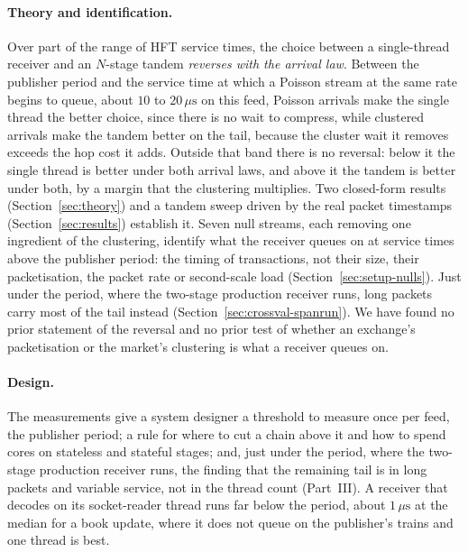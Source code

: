 \documentclass[11pt]{article}
\begin{document}
\paragraph{Theory and identification.} Over part of the range of HFT service times, the
choice between a single-thread receiver and an $N$-stage tandem \emph{reverses with the
arrival law}. Between the publisher period and the service time at which a Poisson stream
at the same rate begins to queue, about $10$ to $20\,\mu\mathrm{s}$ on this feed, Poisson
arrivals make the single thread the better choice, since there is no wait to compress,
while clustered arrivals make the tandem better on the tail, because the cluster wait it
removes exceeds the hop cost it adds. Outside that band there is no reversal: below it the
single thread is better under both arrival laws, and above it the tandem is better under
both, by a margin that the clustering multiplies. Two closed-form results
(Section~\ref{sec:theory}) and a tandem sweep driven by the real packet timestamps
(Section~\ref{sec:results}) establish it. Seven null streams, each removing one
ingredient of the clustering, identify what the receiver queues on at service times above the publisher period: the
timing of transactions, not their size, their packetisation, the packet rate or
second-scale load (Section~\ref{sec:setup-nulls}). Just under the period, where the
two-stage production receiver runs, long packets carry most of the tail instead
(Section~\ref{sec:crossval-spanrun}). We have found no prior statement of the reversal and no
prior test of whether an exchange's packetisation or the market's clustering is what a
receiver queues on.

\paragraph{Design.} The measurements give a system designer a threshold to measure once per feed, the publisher period; a rule for where to cut a chain above it and how to spend
cores on stateless and stateful stages; and, just under the period, where the two-stage
production receiver runs, the finding that the remaining tail is in long packets and
variable service, not in the thread count (Part~III). A receiver that decodes on its
socket-reader thread runs far below the period, about $1\,\mu\mathrm{s}$ at the median for a
book update, where it does not queue on the publisher's trains and one thread is best.
\end{document}
